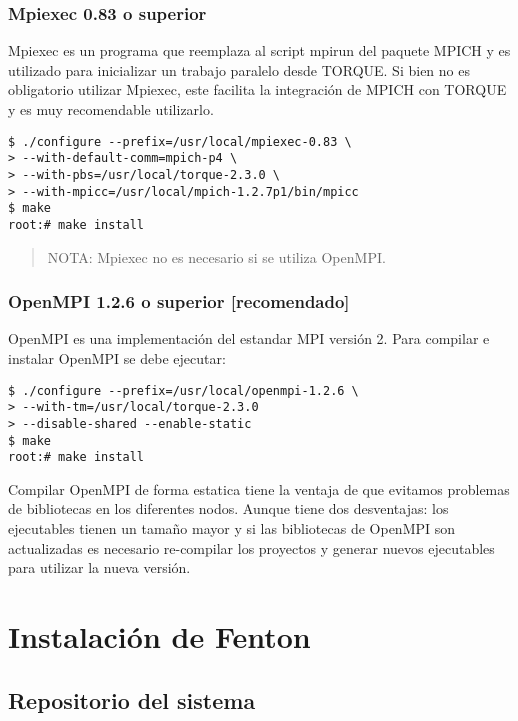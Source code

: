 \documentclass[a4paper,10pt,spanish]{article}
\begin{document}
\subsubsection{Mpiexec 0.83 o superior}

Mpiexec\cite{mpiexec} es un programa que reemplaza al script mpirun del paquete MPICH y es utilizado para inicializar un trabajo paralelo desde TORQUE. Si bien no es obligatorio utilizar Mpiexec, este facilita la integraci\'{o}n de MPICH con TORQUE y es muy recomendable utilizarlo.

\begin{verbatim}
$ ./configure --prefix=/usr/local/mpiexec-0.83 \
> --with-default-comm=mpich-p4 \
> --with-pbs=/usr/local/torque-2.3.0 \
> --with-mpicc=/usr/local/mpich-1.2.7p1/bin/mpicc 
$ make 
root:# make install
\end{verbatim}

\begin{quote}
NOTA: Mpiexec no es necesario si se utiliza OpenMPI.
\end{quote}

\subsubsection{OpenMPI 1.2.6 o superior \small{[recomendado]}}

OpenMPI\cite{openmpi} es una implementaci\'{o}n del estandar MPI versi\'{o}n 2. Para compilar e instalar OpenMPI se debe ejecutar:

\begin{verbatim}
$ ./configure --prefix=/usr/local/openmpi-1.2.6 \
> --with-tm=/usr/local/torque-2.3.0
> --disable-shared --enable-static
$ make
root:# make install
\end{verbatim}

Compilar OpenMPI de forma estatica tiene la ventaja de que evitamos problemas de bibliotecas en los diferentes nodos. Aunque tiene dos desventajas: los ejecutables tienen un tama\~{n}o mayor y si las bibliotecas de OpenMPI son actualizadas es necesario re-compilar los proyectos y generar nuevos ejecutables para utilizar la nueva versi\'{o}n.

\section{Instalaci\'{o}n de Fenton}

\subsection{Repositorio del sistema}
\end{document}

